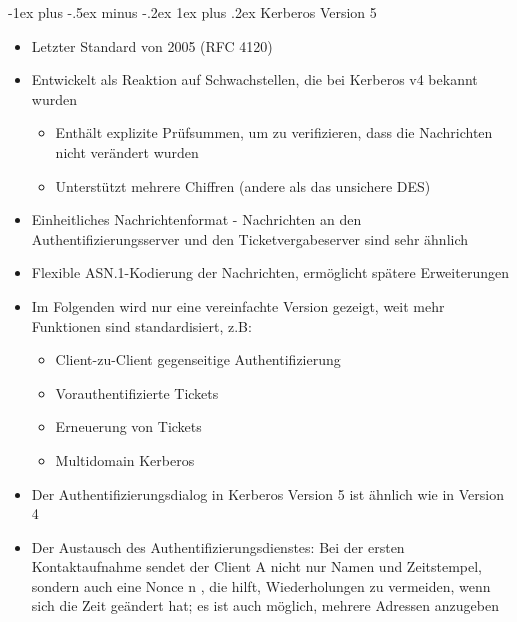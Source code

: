 \documentclass[a4paper]{article}
\makeatletter
\renewcommand{\subsubsection}{\@startsection{subsubsection}{3}{0mm}%
 {-1ex plus -.5ex minus -.2ex}%
 {1ex plus .2ex}%
 {\normalfont\small\bfseries}}
\makeatother
\begin{document}
\begin{multicols}{3}
    \subsubsection{Kerberos Version 5}

    \begin{itemize}
        \item
              Letzter Standard von 2005 (RFC 4120)
        \item
              Entwickelt als Reaktion auf Schwachstellen, die bei Kerberos v4
              bekannt wurden

              \begin{itemize}
                  \item
                        Enthält explizite Prüfsummen, um zu verifizieren, dass die
                        Nachrichten nicht verändert wurden
                  \item
                        Unterstützt mehrere Chiffren (andere als das unsichere DES)
              \end{itemize}
        \item
              Einheitliches Nachrichtenformat - Nachrichten an den
              Authentifizierungsserver und den Ticketvergabeserver sind sehr ähnlich
        \item
              Flexible ASN.1-Kodierung der Nachrichten, ermöglicht spätere
              Erweiterungen
        \item
              Im Folgenden wird nur eine vereinfachte Version gezeigt, weit mehr
              Funktionen sind standardisiert, z.B:

              \begin{itemize}
                  \item
                        Client-zu-Client gegenseitige Authentifizierung
                  \item
                        Vorauthentifizierte Tickets
                  \item
                        Erneuerung von Tickets
                  \item
                        Multidomain Kerberos
              \end{itemize}
        \item
              Der Authentifizierungsdialog in Kerberos Version 5 ist ähnlich wie in
              Version 4
        \item
              Der Austausch des Authentifizierungsdienstes: Bei der ersten
              Kontaktaufnahme sendet der Client A nicht nur Namen und Zeitstempel,
              sondern auch eine Nonce n , die hilft, Wiederholungen zu vermeiden,
              wenn sich die Zeit geändert hat; es ist auch möglich, mehrere Adressen
              anzugeben


\end{itemize}
\end{multicols}
\end{document}
